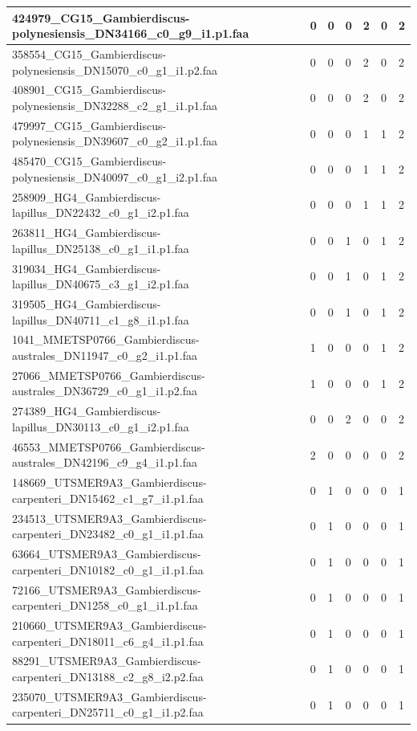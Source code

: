 \documentclass[12pt]{article}
\begin{document}
\begin{longtable}{ | p{2cm} | p{2cm} |p{2.5cm} | p{2cm} | p{2.5cm} |  p{2cm} | p{2cm} |}
 \hline 
424979\_CG15\_Gambierdiscus-polynesiensis\_DN34166\_c0\_g9\_i1.p1.faa&0&0&0&2&0&2\\ 
 \hline 
358554\_CG15\_Gambierdiscus-polynesiensis\_DN15070\_c0\_g1\_i1.p2.faa&0&0&0&2&0&2\\ 
 \hline 
408901\_CG15\_Gambierdiscus-polynesiensis\_DN32288\_c2\_g1\_i1.p1.faa&0&0&0&2&0&2\\ 
 \hline 
479997\_CG15\_Gambierdiscus-polynesiensis\_DN39607\_c0\_g2\_i1.p1.faa&0&0&0&1&1&2\\ 
 \hline 
485470\_CG15\_Gambierdiscus-polynesiensis\_DN40097\_c0\_g1\_i2.p1.faa&0&0&0&1&1&2\\ 
 \hline 
258909\_HG4\_Gambierdiscus-lapillus\_DN22432\_c0\_g1\_i2.p1.faa&0&0&0&1&1&2\\ 
 \hline 
263811\_HG4\_Gambierdiscus-lapillus\_DN25138\_c0\_g1\_i1.p1.faa&0&0&1&0&1&2\\ 
 \hline 
319034\_HG4\_Gambierdiscus-lapillus\_DN40675\_c3\_g1\_i2.p1.faa&0&0&1&0&1&2\\ 
 \hline 
319505\_HG4\_Gambierdiscus-lapillus\_DN40711\_c1\_g8\_i1.p1.faa&0&0&1&0&1&2\\ 
 \hline 
1041\_MMETSP0766\_Gambierdiscus-australes\_DN11947\_c0\_g2\_i1.p1.faa&1&0&0&0&1&2\\ 
 \hline 
27066\_MMETSP0766\_Gambierdiscus-australes\_DN36729\_c0\_g1\_i1.p2.faa&1&0&0&0&1&2\\ 
 \hline 
274389\_HG4\_Gambierdiscus-lapillus\_DN30113\_c0\_g1\_i2.p1.faa&0&0&2&0&0&2\\ 
 \hline 
46553\_MMETSP0766\_Gambierdiscus-australes\_DN42196\_c9\_g4\_i1.p1.faa&2&0&0&0&0&2\\ 
 \hline 
148669\_UTSMER9A3\_Gambierdiscus-carpenteri\_DN15462\_c1\_g7\_i1.p1.faa&0&1&0&0&0&1\\ 
 \hline 
234513\_UTSMER9A3\_Gambierdiscus-carpenteri\_DN23482\_c0\_g1\_i1.p1.faa&0&1&0&0&0&1\\ 
 \hline 
63664\_UTSMER9A3\_Gambierdiscus-carpenteri\_DN10182\_c0\_g1\_i1.p1.faa&0&1&0&0&0&1\\ 
 \hline 
72166\_UTSMER9A3\_Gambierdiscus-carpenteri\_DN1258\_c0\_g1\_i1.p1.faa&0&1&0&0&0&1\\ 
 \hline 
210660\_UTSMER9A3\_Gambierdiscus-carpenteri\_DN18011\_c6\_g4\_i1.p1.faa&0&1&0&0&0&1\\ 
 \hline 
88291\_UTSMER9A3\_Gambierdiscus-carpenteri\_DN13188\_c2\_g8\_i2.p2.faa&0&1&0&0&0&1\\ 
 \hline 
235070\_UTSMER9A3\_Gambierdiscus-carpenteri\_DN25711\_c0\_g1\_i1.p2.faa&0&1&0&0&0&1\\ 

\end{longtable}
\end{document}
